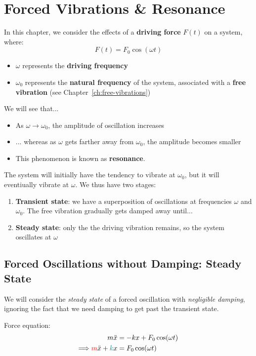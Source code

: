 \chapter{Forced Vibrations \& Resonance}


	In this chapter, we consider the effects of a \textbf{driving force} $F(t)$ on a system, where:
	\[ {F(t) = F_0 \cos(\omega t)} \]
	\begin{itemize}
		\item $\omega$ represents the \textbf{driving frequency}
		\item $\omega_0$ represents the \textbf{natural frequency} of the system, associated with a \textbf{free vibration} (see Chapter~\ref{ch:free-vibrations})
	\end{itemize}



We will see that...
\begin{itemize}
	\item As $\omega \to \omega_0$, the amplitude of oscillation increases
	\item ... whereas as $\omega$ gets farther away from $\omega_0$, the amplitude becomes smaller
	\item This phenomenon is known as \textbf{resonance}.
\end{itemize}

The system will initially have the tendency to vibrate at $\omega_0$, but it will eventiually vibrate at $\omega$. We thus have two stages:
\begin{enumerate}
	\item \textbf{Transient state}: we have a superposition of oscillations at frequencies $\omega$ and $\omega_0$. The free vibration gradually gets damped away until...
	\item \textbf{Steady state}: only the the driving vibration remains, so the system oscillates at $\omega$
\end{enumerate}

\section{Forced Oscillations without Damping: Steady State}	\label{ch4:sec:no-damping-steady}
We will consider the \emph{steady state} of a forced oscillation with \emph{negligible damping}, ignoring the fact that we need damping to get past the transient state.

Force equation:
\begin{align}
	m\ddot{x} &= -kx + F_0 \cos(\omega t)  \notag \\
	\Longrightarrow
	\textcolor{red}{m}\ddot{x} + \textcolor{teal}{k}x &= F_0 \cos(\omega t)	\label{ch4:eq-no-b}
\end{align}

